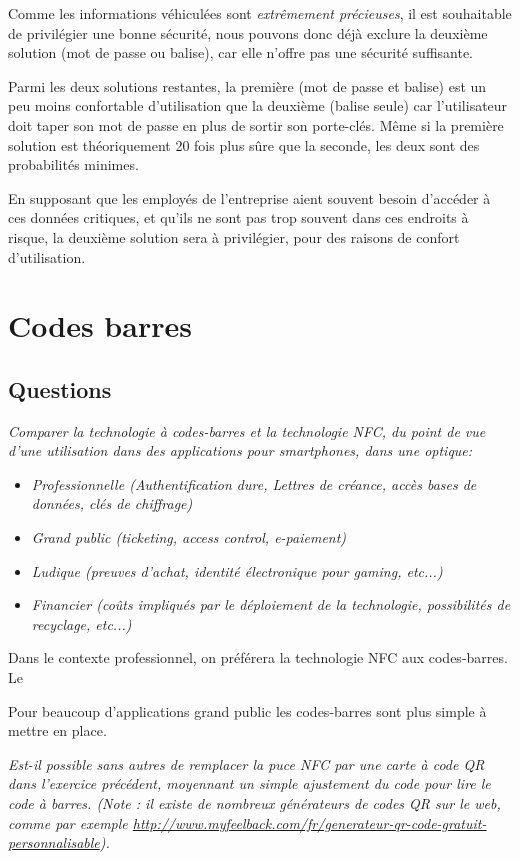 \documentclass[a4paper,11pt,titlepage]{article}
\begin{document}
Comme les informations véhiculées sont \emph{extrêmement précieuses}, il est souhaitable de privilégier une bonne
sécurité, nous pouvons donc déjà exclure la deuxième solution (mot de passe ou balise), car elle n'offre pas une
sécurité suffisante.

Parmi les deux solutions restantes, la première (mot de passe et balise) est un peu moins confortable d'utilisation
que la deuxième (balise seule) car l'utilisateur doit taper son mot de passe en plus de sortir son porte-clés. Même
si la première solution est théoriquement 20 fois plus sûre que la seconde, les deux sont des probabilités minimes.

En supposant que les employés de l'entreprise aient souvent besoin d'accéder à ces données critiques, et qu'ils ne
sont pas trop souvent dans ces endroits à risque, la deuxième solution sera à privilégier, pour des raisons de confort
d'utilisation.

\section{Codes barres}
\subsection*{Questions}
\textit{Comparer la technologie à codes-barres et la technologie NFC, du point de vue d'une utilisation dans
des applications pour smartphones, dans une optique:}
\begin{itemize}
\item \textit{Professionnelle (Authentification dure, Lettres de créance, accès bases de données, clés de chiffrage)}
\item \textit{Grand public (ticketing, access control, e-paiement)}
\item \textit{Ludique (preuves d'achat, identité électronique pour gaming, etc...)}
\item \textit{Financier (coûts impliqués par le déploiement de la technologie, possibilités de recyclage, etc...)}
\end{itemize}

Dans le contexte professionnel, on préférera la technologie NFC aux codes-barres.
Le 

Pour beaucoup d'applications grand public les codes-barres sont plus simple à mettre en place.


\textit{Est-il possible sans autres de remplacer la puce NFC par une carte à code QR dans l'exercice
précédent, moyennant un simple  ajustement du code pour lire le code à barres. (Note : il existe de
nombreux  générateurs  de codes  QR sur le web, comme par exemple
\url{http://www.myfeelback.com/fr/generateur-qr-code-gratuit-personnalisable}).}
\end{document}
